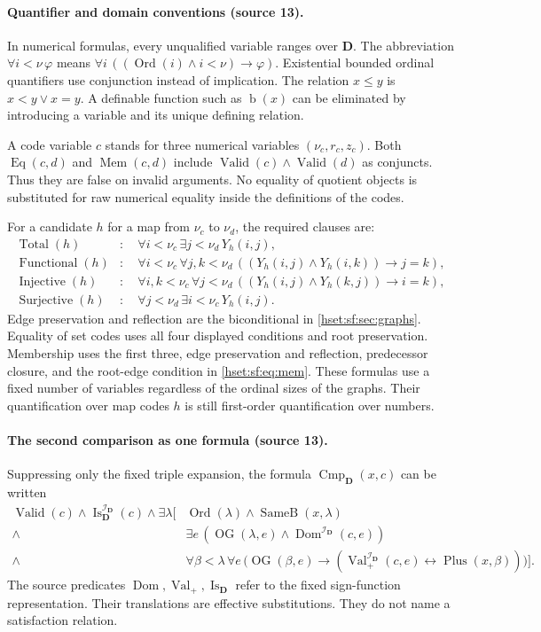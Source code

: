 \documentclass[11pt,letterpaper]{article}
\theoremstyle{definition}
\theoremstyle{remark}
\newcommand{\Ord}{\operatorname{Ord}}
\newcommand{\bd}{\operatorname{b}}
\newcommand{\I}{\mathcal I}
\newcommand{\EqB}{\operatorname{SameB}}
\newcommand{\Plusp}{\operatorname{Plus}}
\newcommand{\Valid}{\operatorname{Valid}}
\newcommand{\Eqc}{\operatorname{Eq}}
\newcommand{\Memc}{\operatorname{Mem}}
\newcommand{\OG}{\operatorname{OG}}
\newcommand{\Cmp}{\operatorname{Cmp}}
\newcommand{\Dd}{\mathbf{D}}
\begin{document}
\paragraph{Quantifier and domain conventions (source 13).} In numerical formulas,
every unqualified variable ranges over $\Dd$. The abbreviation
$\forall i<\nu\,\varphi$ means $\forall i\,((\Ord(i)\land i<\nu)\to\varphi)$.
Existential bounded ordinal quantifiers use conjunction instead of implication. The
relation $x\le y$ is $x<y\lor x=y$. A definable function such as $\bd(x)$ can be
eliminated by introducing a variable and its unique defining relation.

A code variable $c$ stands for three numerical variables $(\nu_c,r_c,z_c)$. Both
$\Eqc(c,d)$ and $\Memc(c,d)$ include $\Valid(c)\land\Valid(d)$ as conjuncts. Thus
they are false on invalid arguments. No equality of quotient objects is substituted
for raw numerical equality inside the definitions of the codes.

For a candidate $h$ for a map from $\nu_c$ to $\nu_d$, the required clauses are:
\[
\begin{split}
 \operatorname{Total}(h)&:\quad \forall i<\nu_c\,\exists j<\nu_d\,Y_h(i,j),\\
 \operatorname{Functional}(h)&:\quad \forall i<\nu_c\,\forall j,k<\nu_d\,((Y_h(i,j)\land Y_h(i,k))\to j=k),\\
 \operatorname{Injective}(h)&:\quad \forall i,k<\nu_c\,\forall j<\nu_d\,((Y_h(i,j)\land Y_h(k,j))\to i=k),\\
 \operatorname{Surjective}(h)&:\quad \forall j<\nu_d\,\exists i<\nu_c\,Y_h(i,j).
\end{split}
\]
Edge preservation and reflection are the biconditional in \cref{hset:sf:sec:graphs}.
Equality of set codes uses all four displayed conditions and root preservation.
Membership uses the first three, edge preservation and reflection, predecessor
closure, and the root-edge condition in \eqref{hset:sf:eq:mem}. These formulas use a
fixed number of variables regardless of the ordinal sizes of the graphs. Their
quantification over map codes $h$ is still first-order quantification over numbers.

\paragraph{The second comparison as one formula (source 13).} Suppressing only the
fixed triple expansion, the formula $\Cmp_{\Dd}(x,c)$ can be written
\[
\begin{split}
 \Valid(c)\land \operatorname{Is}_{\Dd}^{\I_{\Dd}}(c)\land
 \exists\lambda\bigl[&\Ord(\lambda)\land\EqB(x,\lambda)\\
 {}\land{}&\exists e\,(\OG(\lambda,e)\land\operatorname{Dom}^{\I_{\Dd}}(c,e))\\
 {}\land{}&\forall\beta<\lambda\,\forall e\,\bigl(\OG(\beta,e)\to
 (\operatorname{Val}_+^{\I_{\Dd}}(c,e)\leftrightarrow\Plusp(x,\beta))\bigr)\bigr].
\end{split}
\]
The source predicates $\operatorname{Dom},\operatorname{Val}_+,\operatorname{Is}_{\Dd}$
refer to the fixed sign-function representation. Their translations are effective
substitutions. They do not name a satisfaction relation.
\end{document}
